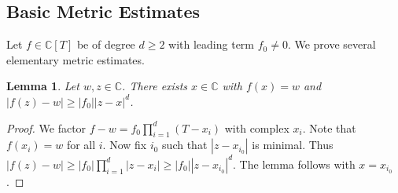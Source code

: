 \documentclass[12pt,oneside,a4]{amsart}
\newcommand{\IC}{\mathbb{C}}
\newcounter{maincounter}
\numberwithin{maincounter}{section}
\numberwithin{equation}{section}
\newtheorem{lemma}[maincounter]{Lemma}
\begin{document}
\subsection{Basic Metric Estimates}


Let $f\in \IC[T]$ be  of degree $d\ge 2$ with leading term
$f_0\not=0$. 
We prove several elementary metric estimates.

\begin{lemma}
  \label{lem:elementaryest}
  Let $w,z\in\IC$. There exists $x\in\IC$ with $f(x)=w$ and
  $|f(z)-w|\ge |f_0||z-x|^d$. 
\end{lemma}
\begin{proof}
  We
  factor $f-w = f_0 \prod_{i=1}^{d} (T-x_i)$ with complex $x_i$. 
  Note that $f(x_i) = w$ for all $i$.
  Now fix $i_0$ such that $|z-x_{i_0}|$ is minimal. 
  Thus
  $|f(z)-w| \ge |f_0|\prod_{i=1}^d |z-x_i|\ge |f_0||z-x_{i_0}|^d$. 
  The lemma follows with $x=x_{i_0}$.
\end{proof}
\end{document}
